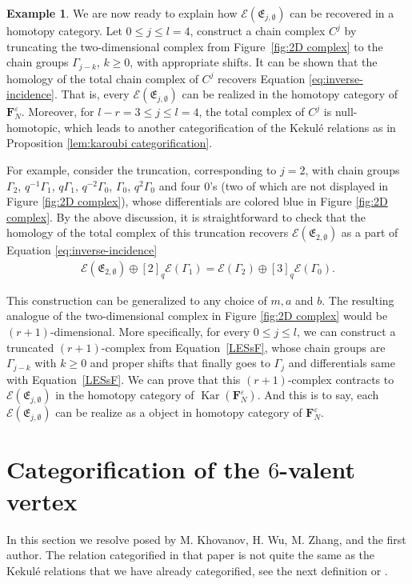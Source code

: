 \documentclass[12pt]{amsart}
\theoremstyle{definition}
\newtheorem{example}[theorem]{Example}
\theoremstyle{remark}
\numberwithin{equation}{section}
\numberwithin{figure}{section}
\newcommand{\Kar}{\operatorname{Kar}}
\newcommand{\Foam}{\mathbf{F}_N}
\begin{document}
\begin{example}
We are now ready to explain how $\mathcal E(\mathfrak{E}_{j,\emptyset})$ can be recovered in a homotopy category. Let $0\leq j\leq l = 4$, construct a chain complex $C^j$ by truncating the two-dimensional complex from Figure~\ref{fig:2D complex} to the chain groups $\Gamma_{j-k}$, $k\geq 0$, with appropriate shifts. It can be shown that the homology of the total chain complex of $C^j$ recovers Equation \eqref{eq:inverse-incidence}. That is, every $\mathcal E(\mathfrak{E}_{j,\emptyset})$ can be realized in the homotopy category of $\Foam^\varepsilon$. Moreover, for $l - r  = 3 \leq j \leq l = 4$,  the total complex of $C^j$ is null-homotopic, which leads to another categorification of the Kekulé relations as in Proposition \ref{lem:karoubi categorification}.

For example, consider the truncation, corresponding to $j = 2$, with chain groups $\Gamma_2$, $q^{-1}\Gamma_1$, $q\Gamma_1$, $q^{-2}\Gamma_0$, $\Gamma_0$, $q^2\Gamma_0$ and four $0$'s (two of which are not displayed in Figure \ref{fig:2D complex}), whose differentials are colored blue in Figure \ref{fig:2D complex}. By the above discussion, it is straightforward to check that the homology of the total complex of this truncation recovers $\mathcal{E}(\mathfrak{E}_{2,\emptyset})$ as a part of Equation \eqref{eq:inverse-incidence}
\begin{align*}
\mathcal{E}(\mathfrak{E}_{2,\emptyset})\oplus[2]_q\mathcal{E}(\Gamma_1)=\mathcal{E}(\Gamma_2)\oplus[3]_q\mathcal{E}(\Gamma_0).
\end{align*}
\end{example}
This construction can be generalized to any choice of $m,a$ and $b$. The resulting analogue of the two-dimensional complex in Figure \ref{fig:2D complex} would be $(r+1)$-dimensional. More specifically, for every $0\leq j\leq l$, we can construct a truncated $(r+1)$-complex from Equation~\eqref{LESsF}, whose chain groups are $\Gamma_{j-k}$ with $k\geq 0$ and proper shifts that finally goes to $\Gamma_j$ and differentials same with Equation~\eqref{LESsF}. We can prove that this $(r+1)$-complex contracts to $\mathcal E(\mathfrak{E}_{j,\emptyset})$ in the homotopy category of $\Kar(\Foam^\varepsilon).$ And this is to say, each $\mathcal E(\mathfrak{E}_{j,\emptyset})$ can be realize as a object in homotopy category of $\Foam^\varepsilon$.



\section{Categorification of the $6$-valent vertex}\label{sec:munu}
In this section we resolve \cite[Conjecture 4.29]{grlj20266valentvertexmathfrakglnweb} posed by M. Khovanov, H. Wu, M. Zhang, and the first author. The relation categorified in that paper is not quite the same as the Kekulé relations that we have already categorified, see the next definition or \cite[Equation 2]{grlj20266valentvertexmathfrakglnweb}.
\end{document}
